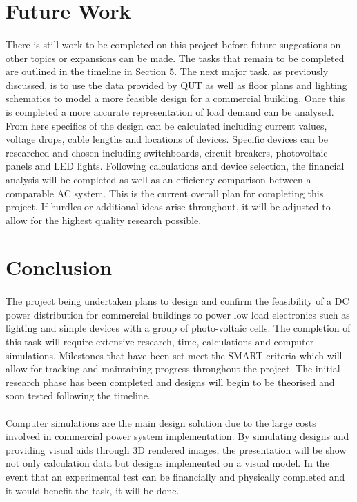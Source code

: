 \section{Future Work}

\paragraph{}
There is still work to be completed on this project before future suggestions on other topics or expansions can be made. The tasks that remain to be completed are outlined in the timeline in Section 5. The next major task, as previously discussed, is to use the data provided by QUT as well as floor plans and lighting schematics to model a more feasible design for a commercial building. Once this is completed a more accurate representation of load demand can be analysed. From here specifics of the design can be calculated including current values, voltage drops, cable lengths and locations of devices. Specific devices can be researched and chosen including switchboards, circuit breakers, photovoltaic panels and LED lights. Following calculations and device selection, the financial analysis will be completed as well as an efficiency comparison between a comparable AC system. This is the current overall plan for completing this project. If hurdles or additional ideas arise throughout, it will be adjusted to allow for the highest quality research possible. 

\newpage 

\section{Conclusion}
\paragraph{}
The project being undertaken plans to design and confirm the feasibility of a DC power distribution for commercial buildings to power low load electronics such as lighting and simple devices with a group of photo-voltaic cells. The completion of this task will require extensive research, time, calculations and computer simulations. Milestones that have been set meet the SMART criteria which will allow for tracking and maintaining progress throughout the project. The initial research phase has been completed and designs will begin to be theorised and soon tested following the timeline. 

\paragraph{}
Computer simulations are the main design solution due to the large costs involved in commercial power system implementation. By simulating designs and providing visual aids through 3D rendered images, the presentation will be show not only calculation data but designs implemented on a visual model. In the event that an experimental test can be financially and physically completed and it would benefit the task, it will be done.    

